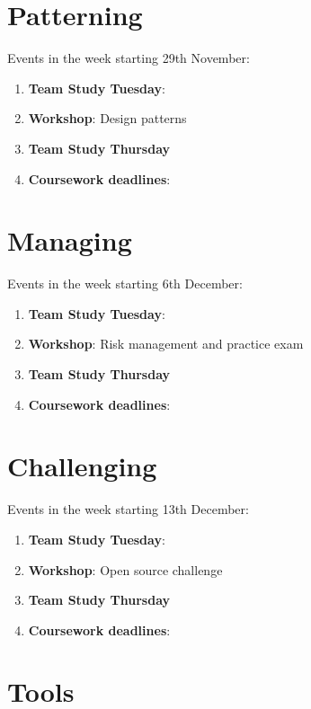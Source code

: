 \documentclass[
]{book}
\providecommand{\tightlist}{%
  \setlength{\itemsep}{0pt}\setlength{\parskip}{0pt}}
\begin{document}
\hypertarget{week10}{%
\section{Patterning}\label{week10}}

Events in the week starting 29th November:

\begin{enumerate}
\def\labelenumi{\arabic{enumi}.}
\tightlist
\item
  \textbf{Team Study Tuesday}:
\item
  \textbf{Workshop}: Design patterns
\item
  \textbf{Team Study Thursday}
\item
  \textbf{Coursework deadlines}:
\end{enumerate}

\hypertarget{week11}{%
\section{Managing}\label{week11}}

Events in the week starting 6th December:

\begin{enumerate}
\def\labelenumi{\arabic{enumi}.}
\tightlist
\item
  \textbf{Team Study Tuesday}:
\item
  \textbf{Workshop}: Risk management and practice exam
\item
  \textbf{Team Study Thursday}
\item
  \textbf{Coursework deadlines}:
\end{enumerate}

\hypertarget{week12}{%
\section{Challenging}\label{week12}}

Events in the week starting 13th December:

\begin{enumerate}
\def\labelenumi{\arabic{enumi}.}
\tightlist
\item
  \textbf{Team Study Tuesday}:
\item
  \textbf{Workshop}: Open source challenge
\item
  \textbf{Team Study Thursday}
\item
  \textbf{Coursework deadlines}:
\end{enumerate}

\hypertarget{tooling}{%
\section{Tools}\label{tooling}}
\end{document}
